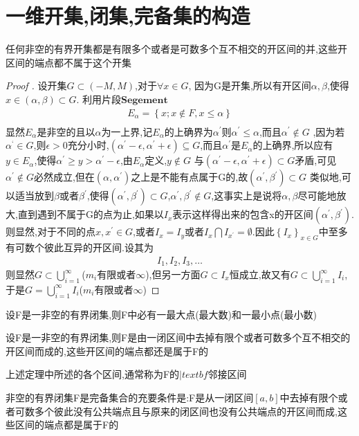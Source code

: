 \section{一维开集,闭集,完备集的构造}
\begin{Theorem}
    任何非空的有界开集都是有限多个或者是可数多个互不相交的开区间的并,这些开区间的端点都不属于这个开集
\end{Theorem}
\begin{proof}[Proof ]
    设开集\(G \subset (-M,M)\),对于\(\forall x \in G\), 因为G是开集,所以有开区间\(\alpha ,\beta \),使得\(x \in (\alpha ,\beta ) \subset G\).
    利用片段\(\textbf{Segement}\)
    \begin{align}
        E_{\alpha }= \left\{x ; x\notin F , x \leq \alpha \right\} \\ 
    \end{align}
    显然\(E_{\alpha }\)是非空的且以\(\alpha \)为一上界,记\(E_{\alpha }\)的上确界为\(\alpha^{'}\)则\(\alpha^{'} \leq \alpha \),而且\(\alpha^{'} \notin G\) ,因为若\(\alpha^{‘} \in G\),则\(\epsilon > 0 \)充分小时,\((\alpha^{'} - \epsilon ,\alpha^{'} +\epsilon) \subseteq G\),而且\(\alpha^{'}\)是\(E_{\alpha}\)的上确界,所以应有\(y \in E_{\alpha}\),使得\(\alpha^{'} \geq y> \alpha^{'} -\epsilon \),由\(E_{\alpha}\)定义,\(y\notin G\)
    与\((\alpha^{'}-\epsilon ,\alpha^{'}+\epsilon ) \subset G\)矛盾,可见\(\alpha^{'} \notin G\)必然成立,但在\((\alpha ,\alpha^{'})\)之上是不能有点属于G的,故\((\alpha^{'},\beta^{'}) \subset G\)
    类似地,可以适当放到\(\beta\)或者\(\beta^{'}\),使得\((\alpha^{'},\beta^{'}) \subset G\),\(\alpha^{'},\beta^{'} \notin G\),这事实上是说将\(\alpha,\beta\)尽可能地放大,直到遇到不属于G的点为止,如果以\(I_{x}\)表示这样得出来的包含x的开区间\((\alpha^{'},\beta^{'})\).则显然,对于不同的点\(x,x^{'} \in G\),或者\(I_x = I_y\)或者\(I_{x} \bigcap I_{x^{'}} = \emptyset\).因此\(\left\{I_{x}\right\}_{x\in G}\)中至多有可数个彼此互异的开区间.设其为
    \begin{align*}
        I_1 ,I_2,I_3,\dots
    \end{align*}
    则显然\(G \subset \bigcup\limits_{i=1}^{\infty}\)(\(m_i\)有限或者\(\infty\)),但另一方面\(G \subset I_{x}\)恒成立,故又有\(G \subset \bigcup\limits_{i=1}^{\infty} I_i\),于是\(G =\bigcup\limits_{i=1}^{\infty} I_i\)(\(m_i\)有限或者\(\infty\))
\end{proof}
\begin{Theorem}
    设F是一非空的有界闭集,则F中必有一最大点(最大数)和一最小点(最小数)
\end{Theorem}
\begin{Theorem}
    设F是一非空的有界闭集,则F是由一闭区间中去掉有限个或者可数多个互不相交的开区间而成的,这些开区间的端点都还是属于F的
\end{Theorem}
上述定理中所述的各个区间,通常称为F的\(|textbf{邻接区间}\)
\begin{Theorem}
    非空的有界闭集F是完备集合的充要条件是:F是从一闭区间\([a,b]\)中去掉有限个或者可数多个彼此没有公共端点且与原来的闭区间也没有公共端点的开区间而成,这些区间的端点都是属于F的
\end{Theorem}
